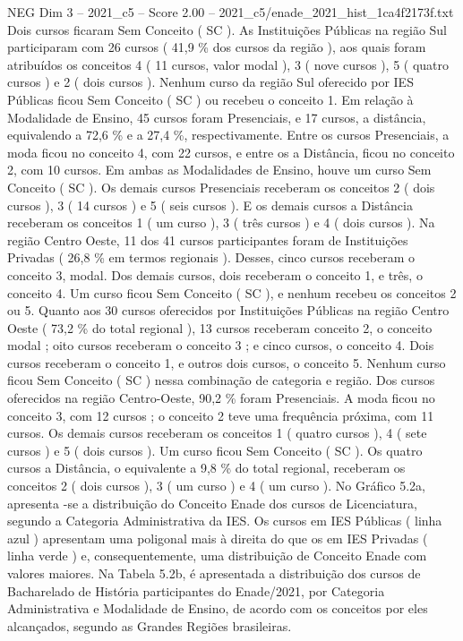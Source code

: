 \begin{textsample}{NEG Dim 3 – 2021\_c5 – Score 2.00 – 2021\_c5/enade\_2021\_hist\_1ca4f2173f.txt}
Dois cursos ficaram Sem Conceito ( SC ).
As Instituições Públicas na região Sul participaram com 26 cursos ( 41,9 \% dos cursos da região ), aos quais foram atribuídos os conceitos 4 ( 11 cursos, valor modal ), 3 ( nove cursos ), 5 ( quatro cursos ) e 2 ( dois cursos ).
Nenhum curso da região Sul oferecido por IES Públicas ficou Sem Conceito ( SC ) ou recebeu o conceito 1.
Em relação à Modalidade de Ensino, 45 cursos foram Presenciais, e 17 cursos, a distância, equivalendo a 72,6 \% e a 27,4 \%, respectivamente.
Entre os cursos Presenciais, a moda ficou no conceito 4, com 22 cursos, e entre os a Distância, ficou no conceito 2, com 10 cursos.
Em ambas as Modalidades de Ensino, houve um curso Sem Conceito ( SC ).
Os demais cursos Presenciais receberam os conceitos 2 ( dois cursos ), 3 ( 14 cursos ) e 5 ( seis cursos ).
E os demais cursos a Distância receberam os conceitos 1 ( um curso ), 3 ( três cursos ) e 4 ( dois cursos ).
Na região Centro Oeste, 11 dos 41 cursos participantes foram de Instituições Privadas ( 26,8 \% em termos regionais ).
Desses, cinco cursos receberam o conceito 3, modal.
Dos demais cursos, dois receberam o conceito 1, e três, o conceito 4.
Um curso ficou Sem Conceito ( SC ), e nenhum recebeu os conceitos 2 ou 5.
Quanto aos 30 cursos oferecidos por Instituições Públicas na região Centro Oeste ( 73,2 \% do total regional ), 13 cursos receberam conceito 2, o conceito modal ; oito cursos receberam o conceito 3 ; e cinco cursos, o conceito 4.
Dois cursos receberam o conceito 1, e outros dois cursos, o conceito 5.
Nenhum curso ficou Sem Conceito ( SC ) nessa combinação de categoria e região.
Dos cursos oferecidos na região Centro-Oeste, 90,2 \% foram Presenciais.
A moda ficou no conceito 3, com 12 cursos ; o conceito 2 teve uma frequência próxima, com 11 cursos.
Os demais cursos receberam os conceitos 1 ( quatro cursos ), 4 ( sete cursos ) e 5 ( dois cursos ).
Um curso ficou Sem Conceito ( SC ).
Os quatro cursos a Distância, o equivalente a 9,8 \% do total regional, receberam os conceitos 2 ( dois cursos ), 3 ( um curso ) e 4 ( um curso ).
No Gráfico 5.2a, apresenta -se a distribuição do Conceito Enade dos cursos de Licenciatura, segundo a Categoria Administrativa da IES.
Os cursos em IES Públicas ( linha azul ) apresentam uma poligonal mais à direita do que os em IES Privadas ( linha verde ) e, consequentemente, uma distribuição de Conceito Enade com valores maiores.
Na Tabela 5.2b, é apresentada a distribuição dos cursos de Bacharelado de História participantes do Enade/2021, por Categoria Administrativa e Modalidade de Ensino, de acordo com os conceitos por eles alcançados, segundo as Grandes Regiões brasileiras.

\end{textsample}
